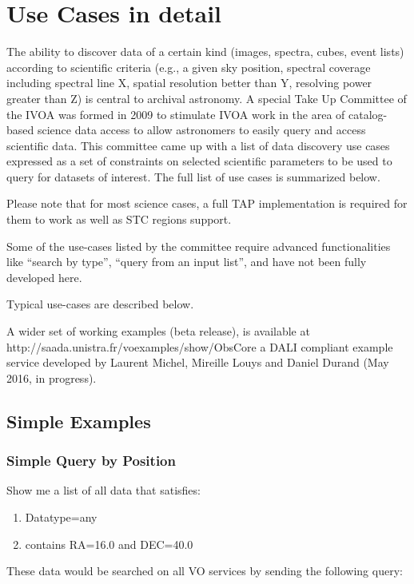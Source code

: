 \documentclass[11pt,a4paper]{ivoa}
\begin{document}


\appendix
\section{Use Cases in detail}
The ability to discover data of a certain kind (images, spectra, cubes, event lists) according to scientific criteria
(e.g., a given sky position, spectral coverage including spectral line X, spatial resolution better than Y, resolving
power greater than Z) is central to archival astronomy. A special Take Up Committee of the IVOA was formed in 2009 to
stimulate IVOA work in the area of catalog-based science data access to allow astronomers to easily query and access
scientific data.  This committee came up with a list of data discovery use cases expressed as a set of constraints on
selected scientific parameters to be used to query for datasets of interest. The full list of use cases is summarized
below.

Please note that for most science cases, a full TAP implementation is required for them to work as well as STC regions
support. \cite{2009ivoa.rept.1030R}

Some of the use-cases listed by the committee require advanced functionalities like ``search by type'', ``query from an
input list'', and have not been fully developed here.

Typical use-cases are described below. 

A wider set of working examples (beta release), is available at http://saada.unistra.fr/voexamples/show/ObsCore a DALI
compliant example service developed by Laurent Michel, Mireille Louys and Daniel Durand (May 2016, in progress).

\subsection*{Simple Examples}

\subsubsection*{Simple Query by Position}
Show me a list of all data that satisfies:
\begin{enumerate}
\item Datatype=any
\item contains RA=16.0 and DEC=40.0
\end{enumerate}
These data would be searched on all VO services by sending the following query:
\end{document}
